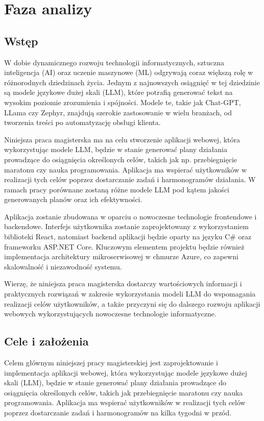 \section{Faza analizy}
\subsection{Wstęp}

W dobie dynamicznego rozwoju technologii informatycznych, sztuczna inteligencja (AI) oraz uczenie maszynowe (ML) odgrywają coraz większą rolę w różnorodnych dziedzinach życia. Jednym z najnowszych osiągnięć w tej dziedzinie są modele językowe dużej skali (LLM), które potrafią generować tekst na wysokim poziomie zrozumienia i spójności. Modele te, takie jak Chat-GPT, LLama czy Zephyr, znajdują szerokie zastosowanie w wielu branżach, od tworzenia treści po automatyzację obsługi klienta.

Niniejsza praca magisterska ma na celu stworzenie aplikacji webowej, która wykorzystując modele LLM, będzie w stanie generować plany działania prowadzące do osiągnięcia określonych celów, takich jak np. przebiegnięcie maratonu czy nauka programowania. Aplikacja ma wspierać użytkowników w realizacji tych celów poprzez dostarczanie zadań i harmonogramów działania. W ramach pracy porównane zostaną różne modele LLM pod kątem jakości generowanych planów oraz ich efektywności.

Aplikacja zostanie zbudowana w oparciu o nowoczesne technologie frontendowe i backendowe. Interfejs użytkownika zostanie zaprojektowany z wykorzystaniem biblioteki React, natomiast backend aplikacji będzie oparty na języku C\# oraz frameworku ASP.NET Core. Kluczowym elementem projektu będzie również implementacja architektury mikroserwisowej w chmurze Azure, co zapewni skalowalność i niezawodność systemu.

Wierzę, że niniejsza praca magisterska dostarczy wartościowych informacji i praktycznych rozwiązań w zakresie wykorzystania modeli LLM do wspomagania realizacji celów użytkowników, a także przyczyni się do dalszego rozwoju aplikacji webowych wykorzystujących nowoczesne technologie informatyczne.

\clearpage

\subsection{Cele i założenia}


Celem głównym niniejszej pracy magisterskiej jest zaprojektowanie i implementacja aplikacji webowej, która wykorzystując modele językowe dużej skali (LLM), będzie w stanie generować plany działania prowadzące do osiągnięcia określonych celów, takich jak przebiegnięcie maratonu czy nauka programowania. Aplikacja ma wspierać użytkowników w realizacji tych celów poprzez dostarczanie zadań i harmonogramów na kilka tygodni w przód.
\\

